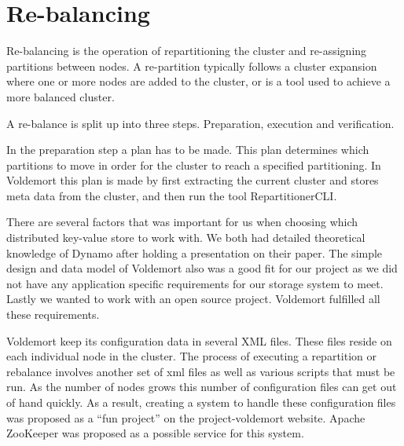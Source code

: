\section{Re-balancing}
Re-balancing is the operation of repartitioning the cluster and re-assigning partitions between nodes. A re-partition typically follows a cluster expansion where one or more nodes are added to the cluster, or is a tool used to achieve a more balanced cluster. 

A re-balance is split up into three steps. Preparation, execution and verification.

In the preparation step a plan has to be made. This plan determines which partitions to move in order for the cluster to reach a specified partitioning. In Voldemort this plan is made by first extracting the current cluster and stores meta data from the cluster, and then run the tool RepartitionerCLI. 


There are several factors that was important for us when choosing which distributed key-value store to work with. We both had detailed theoretical knowledge of Dynamo after holding a presentation on their paper. The simple design and data model of Voldemort also was a good fit for our project as we did not have any application specific requirements for our storage system to meet. Lastly we wanted to work with an open source project. Voldemort fulfilled all these requirements. 

Voldemort keep its configuration data in several XML files. These files reside on each individual node in the cluster. The process of executing a repartition or rebalance involves another set of xml files as well as various scripts that must be run. As the number of nodes grows this number of configuration files can get out of hand quickly. 
As a result, creating a system to handle these configuration files was proposed as a ``fun project'' on the project-voldemort website. Apache ZooKeeper was proposed as a possible service for this system.  


